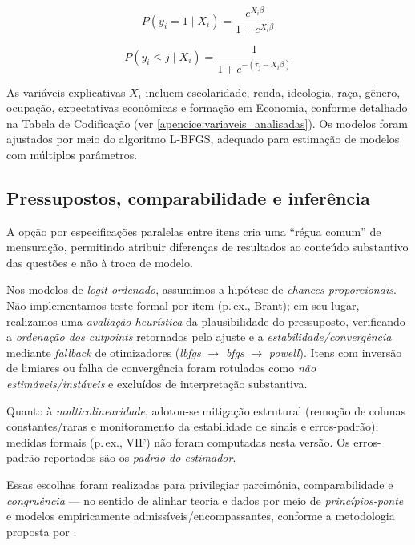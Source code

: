 \begin{equation}
P(y_i = 1 \mid X_i) = \frac{e^{X_i \beta}}{1 + e^{X_i \beta}}
\end{equation}

\begin{equation}
P(y_i \leq j \mid X_i) = \frac{1}{1 + e^{-(\tau_j - X_i \beta)}}
\end{equation}



As variáveis explicativas \(X_i\) incluem escolaridade, renda, ideologia, raça, gênero, ocupação, expectativas econômicas e formação em Economia, conforme detalhado na Tabela de Codificação (ver \autoref{apencice:variaveis_analisadas}). Os modelos foram ajustados por meio do algoritmo L-BFGS, adequado para estimação de modelos com múltiplos parâmetros.

\subsection{Pressupostos, comparabilidade e inferência}\label{sec:pressupostos-inferencia}
A opção por especificações paralelas entre itens cria uma “régua comum” de mensuração, permitindo atribuir diferenças de resultados ao conteúdo substantivo das questões e não à troca de modelo. 

Nos modelos de \textit{logit ordenado}, assumimos a hipótese de \textit{chances proporcionais}. Não implementamos teste formal por item (p.\,ex., Brant); em seu lugar, realizamos uma \textit{avaliação heurística} da plausibilidade do pressuposto, verificando a \textit{ordenação dos cutpoints} retornados pelo ajuste e a \textit{estabilidade/convergência} mediante \textit{fallback} de otimizadores (\textit{lbfgs} $\rightarrow$ \textit{bfgs} $\rightarrow$ \textit{powell}). Itens com inversão de limiares ou falha de convergência foram rotulados como \textit{não estimáveis/instáveis} e excluídos de interpretação substantiva.

Quanto à \textit{multicolinearidade}, adotou-se mitigação estrutural (remoção de colunas constantes/raras e monitoramento da estabilidade de sinais e erros-padrão); medidas formais (p.\,ex., VIF) não foram computadas nesta versão. Os erros-padrão reportados são os \textit{padrão do estimador}. 

Essas escolhas foram realizadas para privilegiar parcimônia, comparabilidade e \textit{congruência} --- no sentido de alinhar teoria e dados por meio de \textit{princípios-ponte} e modelos empiricamente admissíveis/encompassantes, conforme a metodologia proposta por .


